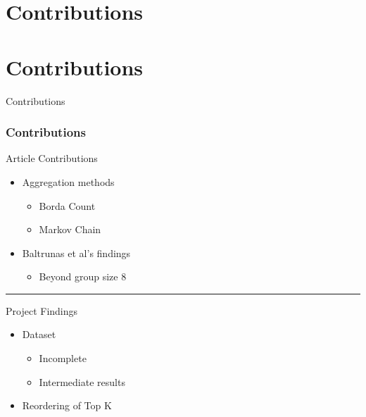 \section{Contributions}

\section{Contributions}
\begin{frame}
     \begin{center}
     	\huge Contributions
     \end{center}
\end{frame}

\begin{frame}
\frametitle{Contributions}
Article Contributions
\begin{itemize}
	\item Aggregation methods
	\begin{itemize}
		\item Borda Count
		\item Markov Chain
	\end{itemize}
	\item Baltrunas et al's findings
	\begin{itemize}
		\item Beyond group size 8
	\end{itemize}
\end{itemize}
\hrule \smallskip
Project Findings
\begin{itemize}
	\item Dataset
	\begin{itemize}
		\item Incomplete
		\item Intermediate results
	\end{itemize}
	\item Reordering of Top K
\end{itemize}
\end{frame}